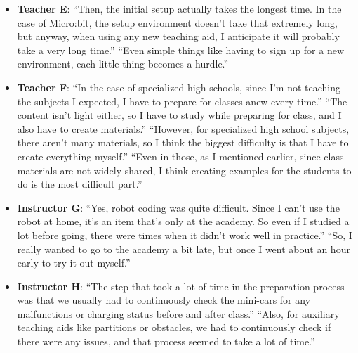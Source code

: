 \documentclass{article} %
\begin{document}
\begin{summarybox}
\begin{itemize}[itemsep=0em, topsep=0.5em, labelsep=0.5em, leftmargin=0.5em]
    \item \textbf{Teacher E}: ``Then, the initial setup actually takes the longest time. In the case of Micro:bit, the setup environment doesn't take that extremely long, but anyway, when using any new teaching aid, I anticipate it will probably take a very long time.''  ``Even simple things like having to sign up for a new environment, each little thing becomes a hurdle.''
    \item \textbf{Teacher F}: ``In the case of specialized high schools, since I'm not teaching the subjects I expected, I have to prepare for classes anew every time.''  ``The content isn't light either, so I have to study while preparing for class, and I also have to create materials.''  ``However, for specialized high school subjects, there aren't many materials, so I think the biggest difficulty is that I have to create everything myself.''  ``Even in those, as I mentioned earlier, since class materials are not widely shared, I think creating examples for the students to do is the most difficult part.''
    \item \textbf{Instructor G}: ``Yes, robot coding was quite difficult. Since I can't use the robot at home, it's an item that's only at the academy. So even if I studied a lot before going, there were times when it didn't work well in practice.''  ``So, I really wanted to go to the academy a bit late, but once I went about an hour early to try it out myself.'' 
    \item \textbf{Instructor H}: ``The step that took a lot of time in the preparation process was that we usually had to continuously check the mini-cars for any malfunctions or charging status before and after class.''  ``Also, for auxiliary teaching aids like partitions or obstacles, we had to continuously check if there were any issues, and that process seemed to take a lot of time.'' 
\end{itemize}
\end{summarybox}
\end{document}
